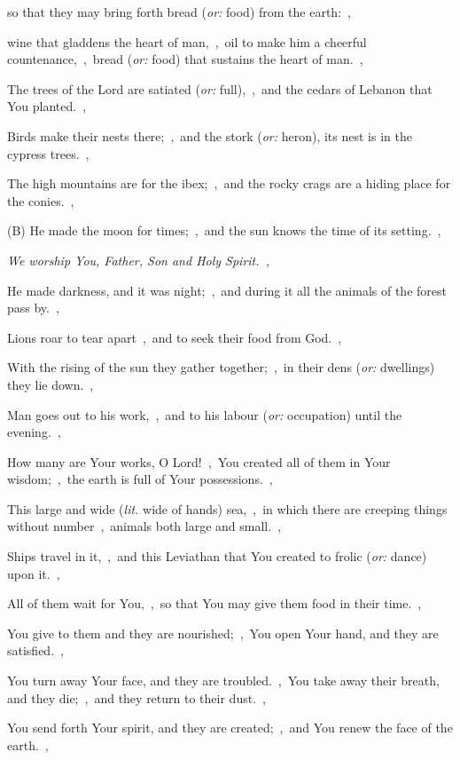 \documentclass[12pt,twoside,a5paper]{article}
\newcommand{\translationoption}[1]{\emph{or:} #1}
\newcommand{\translationliteral}[1]{\emph{lit.} #1}
\begin{document}
\begin{normalparskip}
  so that they may bring forth bread (\translationoption{food}) from the earth:~\sep

  wine that gladdens the heart of man,~\sep\ oil to make him a cheerful countenance,~\sep\ bread (\translationoption{food}) that sustains the heart of man.~\sep

  The trees of the Lord are satiated (\translationoption{full}),~\sep\ and the cedars of Lebanon that You planted.~\sep

  Birds make their nests there;~\sep\ and the stork (\translationoption{heron}), its nest is in the cypress trees.~\sep

  The high mountains are for the ibex;~\sep\ and the rocky crags are a hiding place for the conies.~\sep

  (B) He made the moon for times;~\sep\ and the sun knows the time of its setting.~\sep

  \emph{We worship You, Father, Son and Holy Spirit.~\sep}

  He made darkness, and it was night;~\sep\ and during it all the animals of the forest pass by.~\sep

  Lions roar to tear apart~\sep\ and to seek their food from God.~\sep

  With the rising of the sun they gather together;~\sep\ in their dens (\translationoption{dwellings}) they lie down.~\sep

  Man goes out to his work,~\sep\ and to his labour (\translationoption{occupation}) until the evening.~\sep

  How many are Your works, O Lord!~\sep\ You created all of them in Your wisdom;~\sep\ the earth is full of Your possessions.~\sep

  This large and wide (\translationliteral{wide of hands}) sea,~\sep\ in which there are creeping things without number~\sep\ animals both large and small.~\sep

  Ships travel in it,~\sep\ and this Leviathan that You created to frolic (\translationoption{dance}) upon it.~\sep

  All of them wait for You,~\sep\ so that You may give them food in their time.~\sep

  You give to them and they are nourished;~\sep\ You open Your hand, and they are satisfied.~\sep

  You turn away Your face, and they are troubled.~\sep\ You take away their breath, and they die;~\sep\ and they return to their dust.~\sep

  You send forth Your spirit, and they are created;~\sep\ and You renew the face of the earth.~\sep


\end{normalparskip}
\end{document}
